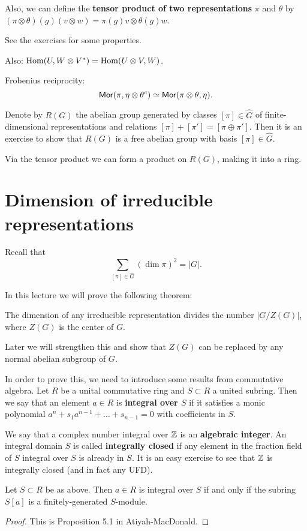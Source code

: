 \documentclass[11pt, english]{article}
\begin{document}
Also, we can define the \textbf{tensor product of two representations} $\pi$ and $\theta$ by $(\pi \otimes \theta)(g)(v \otimes w) = \pi(g)v \otimes \theta(g)w$. 

See the exercises for some properties.

Also: $\operatorname{Hom}(U, W \otimes V^\ast)= \operatorname{Hom}(U \otimes V, W)$. 

Frobenius reciprocity:
$$
\mathsf{Mor}(\pi, \eta \otimes \theta^c) \simeq \mathsf{Mor}(\pi \otimes \theta, \eta).
$$

Denote by $R(G)$ the abelian group generated by classes $[\pi] \in \widehat G$ of finite-dimensional representations and relations $[\pi]+[\pi'] = [\pi \oplus \pi']$.  Then it is an exercise to show that $R(G)$ is a free abelian group with basis $[\pi] \in \widehat G$.

Via the tensor product we can form a product on $R(G)$, making it into a ring.

\newpage
\section{Dimension of irreducible representations}

Recall that $$
\sum_{[\pi] \in \widehat G} (\dim \pi)^2 = \lvert G \rvert. $$

In this lecture we will prove the following theorem:

\begin{thm}
\label{thmzg}
 The dimension of any irreducible representation divides the number $\lvert G/Z(G) \rvert$, where $Z(G)$ is the center of $G$. 
\end{thm}
Later we will strengthen this and show that $Z(G)$ can be replaced by any normal abelian subgroup of $G$.

In order to prove this, we need to introduce some results from commutative algebra. Let $R$ be a unital commutative ring and $S \subset R$ a united subring. Then we say that an element $a \in R$ is \textbf{integral over $S$} if it satisfies a monic polynomial $a^n+s_1a^{n-1}+\ldots+s_{n-1}=0$ with coefficients in $S$.

We say that a complex number integral over $\mathbb{Z}$ is an \textbf{algebraic integer}. An integral domain $S$ is called \textbf{integrally closed} if any element in the fraction field of $S$ integral over $S$ is already in $S$. It is an easy exercise to see that $\mathbb{Z}$ is integrally closed (and in fact any UFD). 

\begin{lemma}
 Let $S \subset R$ be as above. Then $a \in R$ is integral over $S$ if and only if the subring $S[a]$ is a finitely-generated $S$-module.
\end{lemma}
\begin{proof}
This is Proposition 5.1 in Atiyah-MacDonald.
\end{proof}
\end{document}
